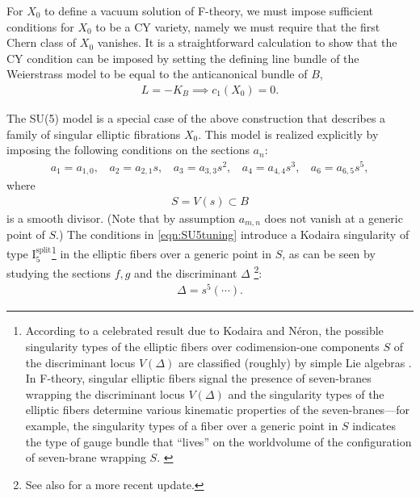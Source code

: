 \documentclass[11pt,oneside,english]{article}
\numberwithin{equation}{section}
\theoremstyle{definition}
\begin{document}
For $X_0$ to define a vacuum solution of F-theory, we must impose sufficient conditions for $X_0$ to be a CY variety, namely we must require that the first Chern class of $X_0$ vanishes. It is a straightforward calculation to show that the CY condition can be imposed by setting the defining line bundle of the Weierstrass model to be equal to the anticanonical bundle of $B$, 
	\begin{align}
		L = -K_B \implies c_1(X_0) = 0. 
	\end{align}


The SU(5) model is a special case of the above construction that describes a family of singular elliptic fibrations $X_0$. This model is realized explicitly by imposing the following conditions on the sections $a_n$:
	\begin{align}
	\label{eqn:SU5tuning}
		a_1 = a_{1,0},~~~~ a_2 = a_{2,1} s,~~~~ a_3 = a_{3,3} s^2,~~~~ a_4 = a_{4,4} s^3,~~~~ a_6 = a_{6,5} s^5,
	\end{align}
where 
	\begin{align}
		S=V( s ) \subset B
	\end{align}
is a smooth divisor. (Note that by assumption $a_{m,n}$ does not vanish at a generic point of $S$.) The conditions in \cref{eqn:SU5tuning} introduce a Kodaira singularity of type I$_5^{\text{split}}$\footnote{According to a celebrated result due to Kodaira and N\'eron, the possible singularity types of the elliptic fibers over codimension-one components $S$ of the discriminant locus $V(\Delta)$ are classified (roughly) by simple Lie algebras \cite{KodairaII,KodairaIII,NeronClassification}. In F-theory, singular elliptic fibers signal the presence of seven-branes wrapping the discriminant locus $V(\Delta)$ and the singularity types of the elliptic fibers determine various kinematic properties of the seven-branes---for example, the singularity types of a fiber over a generic point in $S$ indicates the type of gauge bundle that ``lives'' on the worldvolume of the configuration of seven-brane wrapping $S$. \label{Kodaira}} in the elliptic fibers over a generic point in $S$, as can be seen by studying the sections $f,g$ and the discriminant $\Delta$ \cite{Bershadsky:1996nh,Katz:2011qp}\footnote{See also \cite{Huang:2018gpl} for a more recent update.}:
	\begin{align}
	 \Delta = s^5 (\cdots).
	\end{align}
\end{document}
